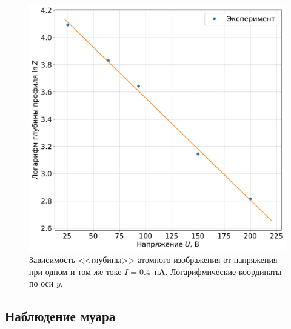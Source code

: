 \documentclass[a4paper, 12pt]{article}
\begin{document}
%	
\begin{figure}[H]
	\centering
	\includegraphics[width=0.7\linewidth]{Curve_profiles}
	\caption{Зависимость <<глубины>> атомного изображения от напряжения при одном и том же токе $I = 0.4$~нА. Логарифмические координаты по оси $y$.}
	\label{fig:2_different_volt_profiles}
\end{figure}

\subsection{Наблюдение муара}
\end{document}
